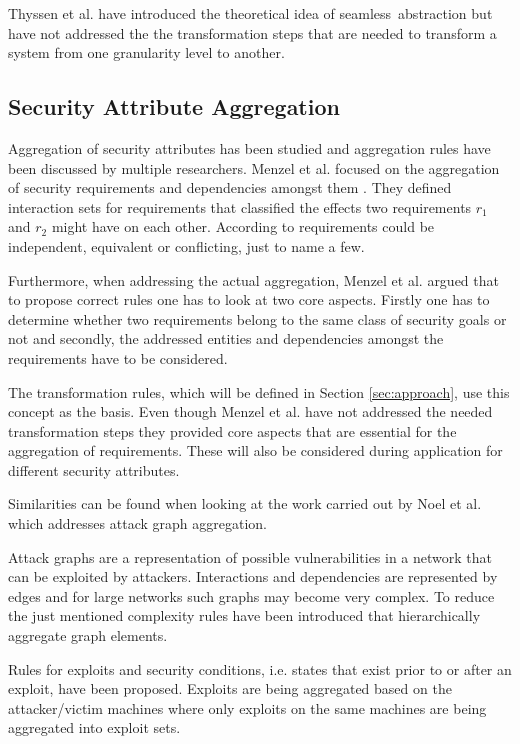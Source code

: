 Thyssen et al. have introduced the theoretical idea of \glqq seamless\grqq \ abstraction but have not addressed the the transformation steps that are needed to transform a system from one granularity level to another.  

\subsection{Security Attribute Aggregation}

Aggregation of security attributes has been studied and aggregation rules have been discussed by multiple researchers. Menzel et al. focused on the aggregation of security requirements and dependencies amongst them \cite{Menzel2008}. They defined interaction sets for requirements that classified the effects two requirements $r_1$ and $r_2$ might have on each other. According to \cite{Menzel2008} requirements could be independent, equivalent or conflicting, just to name a few.

Furthermore, when addressing the actual aggregation, Menzel et al. argued that to propose correct rules one has to look at two core aspects. Firstly one has to determine whether two requirements belong to the same class of security goals or not and secondly, the addressed entities and dependencies amongst the requirements have to be considered.

The transformation rules, which will be defined in Section \ref{sec:approach}, use this concept as the basis. Even though Menzel et al. have not addressed the needed transformation steps they provided core aspects that are essential for the aggregation of requirements. These will also be considered during application for different security attributes.

Similarities can be found when looking at the work carried out by Noel et al. \cite{Noel:2004:MAG:1029208.1029225} which addresses attack graph aggregation. 

Attack graphs are a representation of possible vulnerabilities in a network that can be exploited by attackers.  Interactions and dependencies are represented by edges and for large networks such graphs may become very complex. To reduce the just mentioned complexity rules have been introduced that hierarchically aggregate graph elements. 

Rules for exploits and security conditions, i.e. states that exist prior to or after an exploit, have been proposed. Exploits are being aggregated based on the attacker/victim machines where only exploits on the same machines are being aggregated into exploit sets. 

